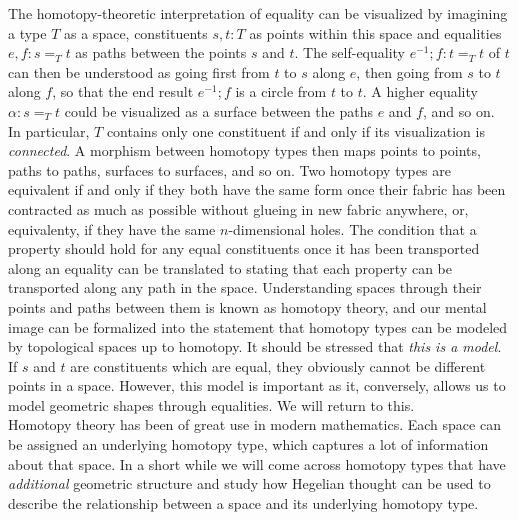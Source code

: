\documentclass{article}
\begin{document}
The homotopy-theoretic interpretation of equality can be visualized by imagining a type $T$ as a space, constituents $s,t:T$ as points within this space and equalities $e,f:s=_T t$ as paths between the points $s$ and $t$. The self-equality $e^{-1};f:t=_T t$ of $t$ can then be understood as going first from $t$ to $s$ along $e$, then going from $s$ to $t$ along $f$, so that the end result $e^{-1};f$ is a circle from $t$ to $t$. A higher equality $\alpha:s=_T t$ could be visualized as a surface between the paths $e$ and $f$, and so on. In particular, $T$ contains only one constituent if and only if its visualization is \emph{connected}. A morphism between homotopy types then maps points to points, paths to paths, surfaces to surfaces, and so on. Two homotopy types are equivalent if and only if they both have the same form once their fabric has been contracted as much as possible without glueing in new fabric anywhere, or, equivalenty, if they have the same $n$-dimensional holes. The condition that a property should hold for any equal constituents once it has been transported along an equality can be translated to stating that each property can be transported along any path in the space. Understanding spaces through their points and paths between them is known as homotopy theory, and our mental image can be formalized into the statement that homotopy types can be modeled by topological spaces up to homotopy. It should be stressed that \emph{this is a model}. If $s$ and $t$ are constituents which are equal, they obviously cannot be different points in a space. However, this model is important as it, conversely, allows us to model geometric shapes through equalities. We will return to this. \\

Homotopy theory has been of great use in modern mathematics. Each space can be assigned an underlying homotopy type, which captures a lot of information about that space. In a short while we will come across homotopy types that have \emph{additional} geometric structure and study how Hegelian thought can be used to describe the relationship between a space and its underlying homotopy type. \\
\end{document}
